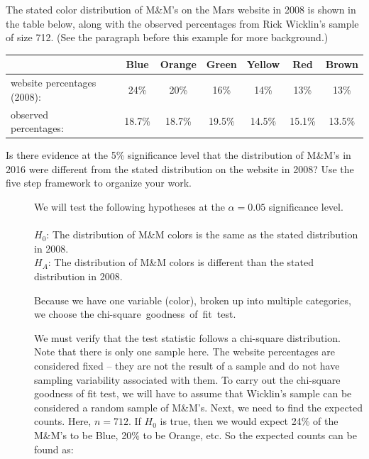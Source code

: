 \begin{examplewrap}
\begin{nexample}
{The stated color distribution of M\&M's on the Mars website in 2008 is shown in the table below, along with the observed percentages from Rick Wicklin's sample of size 712. (See the paragraph before this example for more background.) \\
\begin{center}
\begin{small}
\begin{tabular}{ll ccc ccc}
\hline
	 & \hspace{1mm} & Blue & Orange & Green & Yellow & Red & Brown\\
\hline
website percentages (2008):&		& 24\% & 20\% & 16\% & 14\% & 13\% & 13\%  \\
observed percentages:&		& 18.7\% & 18.7\% & 19.5\% & 14.5\% & 15.1\% & 13.5\%  \\
\hline
\end{tabular}
\end{small}
\end{center}


Is there evidence at the 5\% significance level that the distribution of M\&M's in 2016 were different from the stated distribution on the website in 2008? Use the five step framework to organize your work. }

\begin{description}
\item[]  
We will test the following hypotheses at the $\alpha=0.05$ significance level.\\
\\
$H_0$:  The distribution of M\&M colors is the same as the stated distribution in 2008. \\
$H_A$: The distribution of M\&M colors is different than the stated distribution in 2008.
 

\item[] Because we have one variable (color), broken up into multiple categories, we choose the \mbox{chi-square goodness of fit test.}
\item[]  We must verify that the test statistic follows a chi-square distribution.  Note that there is only one sample here.  The website percentages are considered fixed -- they are not the result of a sample and do not have sampling variability associated with them.  To carry out the chi-square goodness of fit test, we will have to assume that Wicklin's sample can be considered a random sample of M\&M's.  Next, we need to find the expected counts.  Here, $n=712$.  If $H_0$ is true, then we would expect 24\% of the M\&M's to be Blue, 20\% to be Orange, etc.  So the expected counts can be found as:


\end{description}
\end{nexample}
\end{examplewrap}
